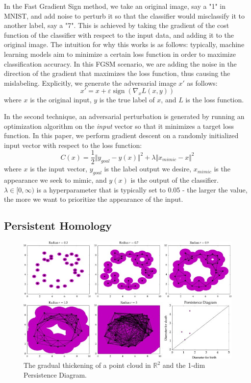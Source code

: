 \documentclass[twoside,twocolumn]{article}
\DeclareMathOperator{\sign}{sign}
\begin{document}
In the Fast Gradient Sign method, we take an original image, say a "1" in MNIST, and add noise to perturb it so that the classifier would misclassify it to another label, say a "7". This is achieved by taking the gradient of the cost function of the classifier with respect to the input data, and adding it to the original image. The intuition for why this works is as follows: typically, machine learning models aim to minimize a certain loss function in order to maximize classification accuracy. In this FGSM scenario, we are adding the noise in the direction of the gradient that maximizes the loss function, thus causing the mislabeling. Explicitly, we generate the adversarial image $x'$ as follows:
$$
x' = x + \varepsilon \sign (\nabla_x L(x,y))
$$
where $x$ is the original input, $y$ is the true label of $x$, and $L$ is the loss function.

In the second technique, an adversarial perturbation is generated by running an optimization algorithm on the \emph{input} vector so that it minimizes a target loss function. In this paper, we perform gradient descent on a randomly initialized input vector with respect to the loss function: 
$$
C(x) = \frac{1}{2} \Vert y_{goal} - y(x) \Vert^2
+ \lambda \Vert x_{mimic} - x \Vert^2
$$  
where $x$ is the input vector, $y_{goal}$ is the label output we desire, $x_{mimic}$ is the appearance we seek to mimic, and $y(x)$ is the output of the classifier. $\lambda \in [0,\infty)$ is a hyperparameter that is typically set to 0.05 - the larger the value, the more we want to prioritize the appearance of the input. 

\subsection{Persistent Homology}

\begin{figure}
    \centering
    \includegraphics[scale=0.55]{figures/pers_hom_example.jpg}
    \caption{The gradual thickening of a point cloud in $\mathbb{R}^2$ and the 1-dim Persistence Diagram.}
    \label{fig:pers_hom_example}
\end{figure}
\end{document}
